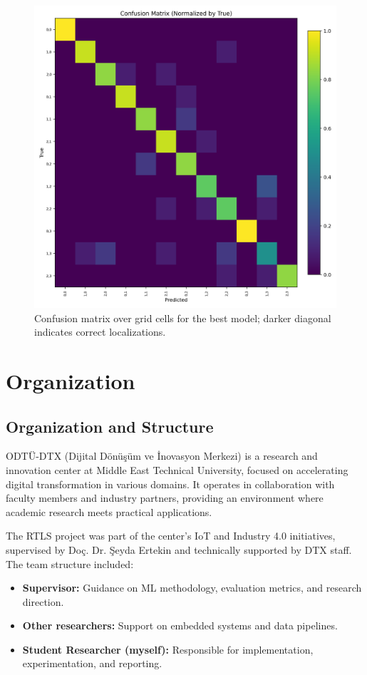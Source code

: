 \documentclass[a4paper,12pt]{report}
\begin{document}
\begin{figure}[H]
    \centering
    \includegraphics[width=\textwidth]{figures/confusion_matrix.png}
    \caption{Confusion matrix over grid cells for the best model; darker diagonal indicates correct localizations.}
    \label{fig:confusion_matrix}
\end{figure}



\chapter{Organization}

\section{Organization and Structure}
ODTÜ-DTX (Dijital Dönüşüm ve İnovasyon Merkezi) is a research and innovation center at Middle East Technical University, focused on accelerating digital transformation in various domains.  
It operates in collaboration with faculty members and industry partners, providing an environment where academic research meets practical applications.  

The RTLS project was part of the center’s IoT and Industry 4.0 initiatives, supervised  by Doç. Dr. Şeyda Ertekin and technically supported by DTX staff.  
The team structure included:
\begin{itemize}
    \item \textbf{Supervisor:} Guidance on ML methodology, evaluation metrics, and research direction.
    \item \textbf{Other researchers:} Support on embedded systems and data pipelines.
    \item \textbf{Student Researcher (myself):} Responsible for implementation, experimentation, and reporting.
\end{itemize}
\end{document}
